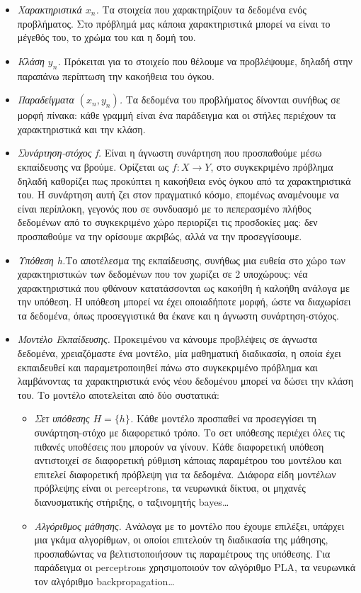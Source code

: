 \documentclass[11pt]{report}
\begin{document}
\begin{itemize}
\item \textit{Χαρακτηριστικά $x_n$.} Τα στοιχεία που χαρακτηρίζουν τα δεδομένα ενός προβλήματος. Στο πρόβλημά μας κάποια χαρακτηριστικά μπορεί να είναι το μέγεθός του, το χρώμα του και η δομή του.
\item \textit{Κλάση $y_n$.} Πρόκειται για το στοιχείο που θέλουμε να προβλέψουμε, δηλαδή στην παραπάνω περίπτωση την κακοήθεια του όγκου.
\item \textit{Παραδείγματα $(x_n, y_n)$.} Τα δεδομένα του προβλήματος δίνονται συνήθως σε μορφή πίνακα: κάθε γραμμή είναι ένα παράδειγμα και οι στήλες περιέχουν τα χαρακτηριστικά και την κλάση.
\item \textit{Συνάρτηση-στόχος f. }Είναι η άγνωστη συνάρτηση που προσπαθούμε μέσω εκπαίδευσης να βρούμε. Ορίζεται ως $f : X \rightarrow Y $, στο συγκεκριμένο πρόβλημα δηλαδή καθορίζει πως προκύπτει η κακοήθεια ενός όγκου από τα χαρακτηριστικά του. Η συνάρτηση αυτή ζει στον πραγματικό κόσμο, επομένως αναμένουμε να είναι περίπλοκη, γεγονός που σε συνδυασμό με το πεπερασμένο πλήθος δεδομένων από το συγκεκριμένο χώρο περιορίζει τις προσδοκίες μας: δεν προσπαθούμε να την ορίσουμε ακριβώς, αλλά να την προσεγγίσουμε.
\item \textit{Υπόθεση h.}Το αποτέλεσμα της εκπαίδευσης, συνήθως μια ευθεία στο χώρο των χαρακτηριστικών των δεδομένων που τον χωρίζει σε 2 υποχώρους: νέα χαρακτηριστικά που φθάνουν κατατάσσονται ως κακοήθη ή καλοήθη ανάλογα με την υπόθεση. Η υπόθεση μπορεί να έχει οποιαδήποτε μορφή, ώστε να διαχωρίσει τα δεδομένα, όπως προσεγγιστικά θα έκανε και η άγνωστη συνάρτηση-στόχος.
\item \textit{Μοντέλο Εκπαίδευσης.} Προκειμένου να κάνουμε προβλέψεις σε άγνωστα δεδομένα, χρειαζόμαστε ένα μοντέλο, μία μαθηματική διαδικασία, η οποία έχει εκπαιδευθεί και παραμετροποιηθεί πάνω στο συγκεκριμένο πρόβλημα και λαμβάνοντας τα χαρακτηριστικά ενός νέου δεδομένου μπορεί να δώσει την κλάση του. Το μοντέλο αποτελείται από δύο συστατικά:
\begin{itemize}
\item \textit{Σετ υπόθεσης $H = \{h\}$.} Κάθε μοντέλο προσπαθεί να προσεγγίσει τη συνάρτηση-στόχο με διαφορετικό τρόπο. Το σετ υπόθεσης περιέχει όλες τις πιθανές υποθέσεις που μπορούν να γίνουν. Κάθε διαφορετική υπόθεση αντιστοιχεί σε διαφορετική ρύθμιση κάποιας παραμέτρου του μοντέλου και επιτελεί διαφορετική πρόβλεψη για τα δεδομένα.  Διάφορα είδη μοντέλων πρόβλεψης είναι οι perceptrons, τα νευρωνικά δίκτυα, οι μηχανές διανυσματικής στήριξης, ο ταξινομητής bayes…
\item \textit{Αλγόριθμος μάθησης.} Ανάλογα με το μοντέλο που έχουμε επιλέξει, υπάρχει μια γκάμα αλγορίθμων, οι οποίοι επιτελούν τη διαδικασία της μάθησης, προσπαθώντας να βελτιστοποιήσουν τις παραμέτρους της υπόθεσης. Για παράδειγμα οι perceptrons χρησιμοποιούν τον αλγόριθμο PLA, τα νευρωνικά τον αλγόριθμο backpropagation…
\end{itemize}
\end{itemize}


\appendix
%
\end{document}
